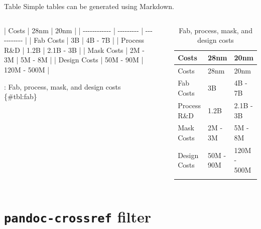 \documentclass[
  10pt,
  ignorenonframetext,
  serif,onlymath]{beamer}
\newenvironment{Shaded}{}{}
\newcommand{\NormalTok}[1]{#1}
\begin{document}
\begin{frame}[fragile]{Table}
\protect\hypertarget{sec:table}{}
Simple tables can be generated using Markdown.

\scriptsize

\begin{columns}

\begin{Shaded}
\begin{Highlighting}[]
\NormalTok{| Costs        | 28nm      | 20nm        |}
\NormalTok{| {-}{-}{-}{-}{-}{-}{-}{-}{-}{-}{-}{-} | {-}{-}{-}{-}{-}{-}{-}{-}{-} | {-}{-}{-}{-}{-}{-}{-}{-}{-}{-}{-} |}
\NormalTok{| Fab Costs    | 3B        | 4B {-} 7B     |}
\NormalTok{| Process R\&D  | 1.2B      | 2.1B {-} 3B   |}
\NormalTok{| Mask Costs   | 2M {-} 3M   | 5M {-} 8M     |}
\NormalTok{| Design Costs | 50M {-} 90M | 120M {-} 500M |}

\NormalTok{: Fab, process, mask, and design}
\NormalTok{  costs \{\#tbl:fab\}}
\end{Highlighting}
\end{Shaded}


\hypertarget{tbl:fab}{}
\begin{longtable}[]{@{}lll@{}}
\caption{\label{tbl:fab}Fab, process, mask, and design
costs}\tabularnewline
\toprule\noalign{}
Costs & 28nm & 20nm \\
\midrule\noalign{}
\endfirsthead
\toprule\noalign{}
Costs & 28nm & 20nm \\
\midrule\noalign{}
\endhead
Fab Costs & 3B & 4B - 7B \\
Process R\&D & 1.2B & 2.1B - 3B \\
Mask Costs & 2M - 3M & 5M - 8M \\
Design Costs & 50M - 90M & 120M - 500M \\
\bottomrule\noalign{}
\end{longtable}

\end{columns}
\end{frame}

\hypertarget{sec:pandoc-crossref-filter}{%
\section{\texorpdfstring{\texttt{pandoc-crossref}
filter}{pandoc-crossref filter}}\label{sec:pandoc-crossref-filter}}
\end{document}
